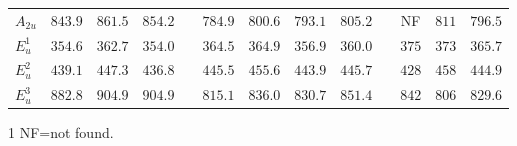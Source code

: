 \documentclass[multi=tabular]{standalone}
\begin{document}
\begin{threeparttable}
{\begin{tabular}{lcccccccccccc}
   $A_{2u} $   &$843.9$ & $861.5$ & $854.2$ && $784.9$ & $800.6$ & $793.1$ & $805.2$ && NF      & $811$ & $796.5$ \\  
   $E^1_{u}$   &$354.6$ & $362.7$ & $354.0$ && $364.5$ & $364.9$ & $356.9$ & $360.0$ && $375$   & $373$ & $365.7$ \\ 
   $E^2_{u}$   &$439.1$ & $447.3$ & $436.8$ && $445.5$ & $455.6$ & $443.9$ & $445.7$ && $428$   & $458$ & $444.9$ \\
   $E^3_{u}$   &$882.8$ & $904.9$ & $904.9$ && $815.1$ & $836.0$ & $830.7$ & $851.4$ && $842$   & $806$ & $829.6$ \\  
    \hline
   \hline
  \end{tabular}
}
 \renewcommand{\arraystretch}{1.0}
\begin{tablenotes}
\item[1] NF=not found.
\end{tablenotes}
\end{threeparttable}


\begin{comment}
もとはLOについて以下の結果を使っていたが，eps^infに実験値を使うようにして改善した．
   $A_{2u} $   &$762.1$ & $781.6$ & $850.6$ && $747.6$ & $764.1$ & $757.3$ && NF      & $811$ & $796.5$ \\  
   $E^1_{u}$   &$354.6$ & $360.5$ & $351.7$ && $364.8$ & $382.0$ & $357.3$ && $375$   & $373$ & $365.7$ \\ 
   $E^2_{u}$   &$439.1$ & $444.6$ & $434.3$ && $443.3$ & $452.8$ & $441.9$ && $428$   & $458$ & $444.9$ \\
   $E^3_{u}$   &$797.0$ & $821.2$ & $815.5$ && $776.6$ & $798.5$ & $792.9$ && $842$   & $806$ & $829.6$ \\  

/home/k0151/k015124/research/yuuden/VASP_rutile/VASP_LDA/harm_600eV/224_anharm/lasso_CV/scph_bubble3_300K/
\end{comment}





\begin{comment}
224 SCPH+$r^2$SCAN
      4    129.6413 cm^-1 
      5    138.8572 cm^-1 
      6    179.3871 cm^-1 
      7    186.8836 cm^-1 
      8    186.8864 cm^-1 
      9    374.8607 cm^-1 
     10    374.8613 cm^-1 
     11    411.6794 cm^-1 
     12    431.4766 cm^-1 
     13    451.8725 cm^-1 
     14    451.8734 cm^-1 
     15    500.1127 cm^-1 
     16    500.1139 cm^-1 
     17    613.3322 cm^-1 
     18    821.8062 cm^-1 
\end{comment}
\end{document}
